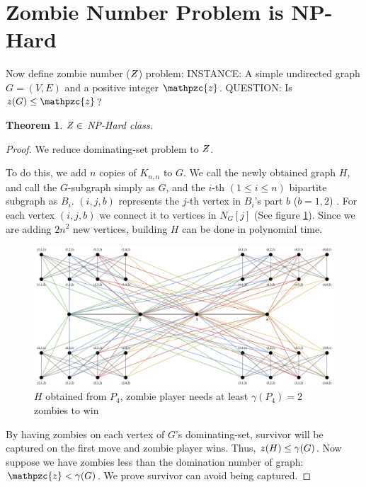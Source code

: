 \documentclass[1p]{elsarticle}
\newtheorem{theorem}{Theorem}
\newcommand{\NPZ}{\ooalign{$Z$\cr\hfil\rule[.8ex]{.3em}{.09ex}\hfil\cr}}
\newcommand{\zn}{\ooalign{$z$\cr\hfil\rule[.5ex]{.2em}{.08ex}\hfil\cr}}
\begin{document}
	\section{Zombie Number Problem is NP-Hard}\label{np-zombienumber}

	Now define zombie number ($\NPZ$) problem:
	{\newline}
	INSTANCE: A simple undirected graph $G = (V,E)$ and a positive integer $\mathpzc{z}$.
	{\newline}
	QUESTION: Is $\zn (G) \leq \mathpzc{z}$?

	\begin{theorem}
		$\NPZ \in$ NP-Hard class.
	\end{theorem}
	\begin{proof}
		We reduce dominating-set problem to $\NPZ$.

		To do this, we add $n$ copies of $K_{n,n}$ to $G$. We call the newly obtained graph $H$, and call the
		$G$-subgraph simply as $G$, and the $i$-th $(1 \leq i \leq n)$ bipartite subgraph as $B_i$. $(i,j,b)$ represents
		the $j$-th vertex in $B_i$'s part $b$ ($b = 1,2$) . For each vertex $(i,j,b)$ we connect it to vertices in
		$N_G[j]$ (See figure \ref{fig:p8}). Since we are adding $2n^2$ new vertices, building $H$ can be done in
		polynomial time.

		\begin{figure}[h!]
			\centering
			\includegraphics[width=0.9\linewidth]{fig/sec5.png}
			\caption{$H$ obtained from $P_4$, zombie player needs at least $\gamma(P_4) = 2$ zombies to win}
			\label{fig:p8}
		\end{figure}

		By having zombies on each vertex of $G$'s dominating-set, survivor will be captured on the first move and zombie
		player wins. Thus, $\zn(H) \leq \gamma(G)$. Now suppose we have zombies less than the domination number of
		graph: $\mathpzc{z} < \gamma(G)$. We prove survivor can avoid being captured.
		

\end{proof}
\end{document}
